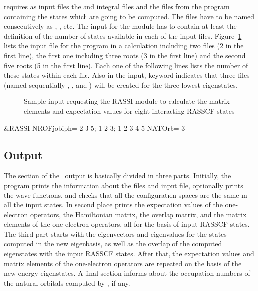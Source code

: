  requires as input files the  and 
integral files and the  files from the  program
containing the states which are going to be computed. The  files
have to be named consecutively as , , etc.
The input for the  module has to contain at least
the definition of the number of states available in each of the input
 files. Figure~\ref{fig:rassi_input} lists the input file
for the  program in a calculation including two  
files (2 in the first line), the first one including three roots (3 in the first
line) and the second five roots (5 in the first line). Each one of the 
following lines lists the number of these states within each  file.
Also in the input, keyword  indicates that three files
(named sequentially , , and ) will
be created for the three lowest eigenstates.


\begin{figure}[ht]
\caption{Sample input requesting the RASSI module to calculate the matrix 
elements and expectation values for eight interacting RASSCF states}
\label{fig:rassi_input}
\end{figure}
\begin{inputlisting}
 &RASSI
NROFjobiph= 2 3 5; 1 2 3; 1 2 3 4 5
NATOrb= 3
\end{inputlisting}

\subsection{ Output}


The  section of the \molcas\ output is basically divided
in three parts. Initially, the program prints the information about the
 files and input file, optionally prints the wave functions,
and checks that all the configuration spaces are the same in all the
input states. In second place  prints the expectation
values of the one-electron operators, the Hamiltonian matrix, the
overlap matrix, and the matrix elements of the one-electron operators,
all for the basis of input RASSCF states. The third part starts with
the eigenvectors and eigenvalues for the states computed in
the new eigenbasis, as well as the overlap of the computed eigenstates
with the input RASSCF states. After that, the expectation values and
matrix elements of the one-electron operators are repeated on the
basis of the new energy eigenstates. A final section informs about 
the occupation numbers of the natural orbitals computed by 
, if any.

